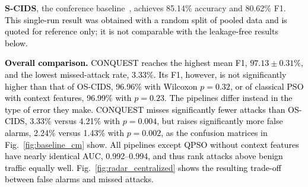 \documentclass[conference]{IEEEtran}
\begin{document}
\begin{table}[!t]
\centering
\caption{\textcolor{black}{Centralized detection over ten seeds, with Wilcoxon p-values against CONQUEST. \textsuperscript{\textdagger}Conference result~\cite{ajakweconquest}, not directly comparable.}}
\label{tab:cyberworm_high_impact}
\setlength{\tabcolsep}{3pt}
\end{table}

\textbf{S-CIDS}, the conference baseline~\cite{ajakweconquest},
achieves 85.14\% accuracy and 80.62\% F1. \textcolor{black}{This single-run result was
obtained with a random split of pooled data and is quoted for
reference only; it is not comparable with the leakage-free results
below.}



\textcolor{black}{\textbf{Overall comparison.}
CONQUEST reaches the highest mean F1, $97.13\pm0.31\%$, and the lowest
missed-attack rate, 3.33\%. Its F1, however, is not significantly
higher than that of OS-CIDS, 96.96\% with Wilcoxon $p=0.32$, or of
classical PSO with context features, 96.99\% with $p=0.23$. The
pipelines differ instead in the type of error they make. CONQUEST
misses significantly fewer attacks than OS-CIDS, 3.33\% versus 4.21\%
with $p=0.004$, but raises significantly more false alarms, 2.24\%
versus 1.43\% with $p=0.002$, as the confusion matrices in
Fig.~\ref{fig:baseline_cm} show. All pipelines except QPSO without
context features have nearly identical AUC, 0.992--0.994, and thus
rank attacks above benign traffic equally well.
Fig.~\ref{fig:radar_centralized} shows the resulting trade-off between
false alarms and missed attacks.}
\end{document}
